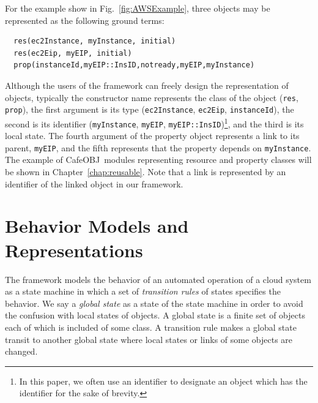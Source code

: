 \documentclass[12pt]{report}
\newcommand{\cafeobj}{{\sf CafeOBJ}~}
\begin{document}
For the example show in Fig.~\ref{fig:AWSExample}, three objects may
be represented as the following ground terms:
\small
\begin{verbatim}
  res(ec2Instance, myInstance, initial)
  res(ec2Eip, myEIP, initial)
  prop(instanceId,myEIP::InsID,notready,myEIP,myInstance)
\end{verbatim}
\normalsize
Although the users of the framework can freely design the
representation of objects, typically the constructor name represents
the class of the object ({\tt res}, {\tt prop}), the first argument is
its type ({\tt ec2Instance}, {\tt ec2Eip}, {\tt instanceId}), the
second is its identifier ({\tt myInstance}, {\tt myEIP},
{\tt myEIP::InsID})\footnote{In this paper, we often use an identifier
  to designate an object which has the identifier for the sake of
  brevity.}, and the third is its local state. The fourth argument of the
property object represents a link to its parent, {\tt myEIP}, and the
fifth represents that the property depends on {\tt myInstance}. The
example of \cafeobj modules representing resource and property classes
will be shown in Chapter~\ref{chap:reusable}.
Note that a link is represented by an identifier of the linked object
in our framework.
\section{Behavior Models and Representations}
\label{sec:behaviormodel}
The framework models the behavior of an automated operation of a cloud
system as a state machine in which a set of {\it transition rules} of
states specifies the behavior. We say a {\it global state} as a state
of the state machine in order to avoid the confusion with local states
of objects. A global state is a finite set of objects each of which is
included of some class. A transition rule makes a global state transit
to another global state where local states or links of some objects
are changed.
\end{document}
